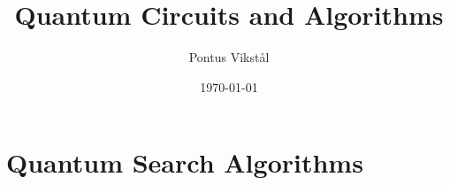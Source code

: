 \documentclass[a4paper,draft]{article}
\title{Quantum Circuits and Algorithms}
\author{Pontus Vikstål}
\date{\today}
\begin{document}
\maketitle

\section{Quantum Search Algorithms}


%
%
\end{document}
